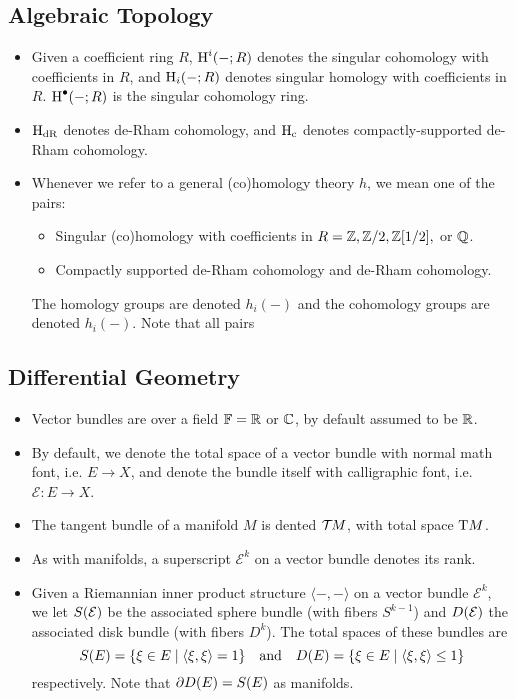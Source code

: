 \subsection*{Algebraic Topology}
\begin{itemize}
  \item Given a coefficient ring $R$, $\H^i(-; R)$ denotes the singular cohomology with coefficients in $R$, and $\H_i(-;R)$ denotes singular homology with coefficients in $R$. $\H^\bullet(-;R)$ is the singular cohomology ring.
  \item $\HdR$ denotes de-Rham cohomology, and $\Hc$ denotes compactly-supported de-Rham cohomology.
  \item Whenever we refer to a general (co)homology theory $h$, we mean one of the pairs:
    \begin{itemize}
      \item Singular (co)homology with coefficients in $R=\Z, \Z/2, \Z[1/2],$ or $\Q$.
      \item Compactly supported de-Rham cohomology and de-Rham cohomology.
    \end{itemize}
    The homology groups are denoted $h_i(-)$ and the cohomology groups are denoted $h_i(-)$. Note that all pairs 
\end{itemize}

\subsection*{Differential Geometry}
\begin{itemize}
  \item Vector bundles are over a field $\F=\R$ or $\C$, by default assumed to be $\R$.

  \item By default, we denote the total space of a vector bundle with normal math font, i.e. $E \to X$, and denote the bundle itself with calligraphic font, i.e. $\mathcal{E} : E \to X$. 

  \item The tangent bundle of a manifold $M$ is dented $\TT M$, with total space $\T M$.

  \item As with manifolds, a superscript $\mathcal{E}^k$ on a vector bundle denotes its rank. 

  \item Given a Riemannian inner product structure $\langle-,-\rangle$ on a vector bundle $\mathcal{E}^k$, we let $\S(\mathcal{E})$ be the associated sphere bundle (with fibers $S^{k-1}$) and $\D(\mathcal{E})$ the associated disk bundle (with fibers $D^k$). The total spaces of these bundles are
  \[
    \S(E) = \{ \xi\in E \mid \langle \xi, \xi\rangle =1 \}
    \quad\textrm{and}\quad
    \D(E) = \{ \xi\in E \mid \langle \xi, \xi\rangle\leq 1 \}
  \]
  respectively. Note that $\partial \D(E) = \S(E)$ as manifolds.
\end{itemize}

